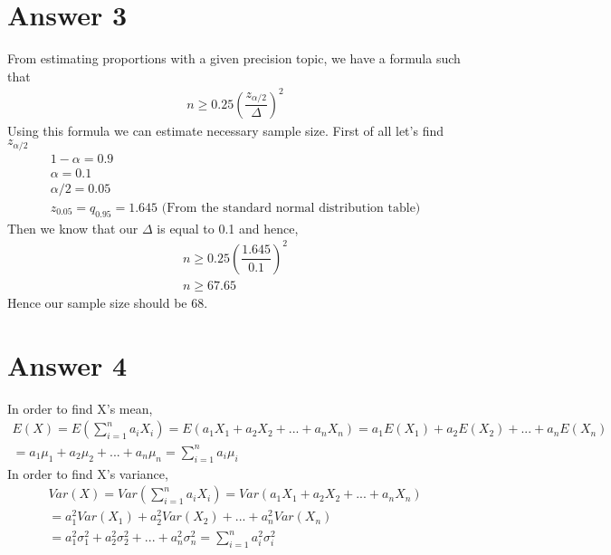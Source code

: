 \documentclass[12pt]{article}
\begin{document}
\section*{Answer 3}
From estimating proportions with a given precision topic, we have a formula such that
\begin{gather*}
    n \geq 0.25(\dfrac{z_{\alpha/2}}{\Delta})^2
\end{gather*}
Using this formula we can estimate necessary sample size. First of all let's find $z_{\alpha/2}$
\begin{gather*}
    1-\alpha = 0.9\\
    \alpha = 0.1 \\
    \alpha/2 = 0.05 \\
    z_{0.05} = q_{0.95} = 1.645 \text{   (From the standard normal distribution table)}
\end{gather*}
Then we know that our $\Delta$ is equal to 0.1 and hence,
\begin{gather*}
    n \geq 0.25 ( \dfrac{1.645}{0.1})^2 \\
    n \geq 67.65
\end{gather*}
Hence our sample size should be 68.
\section*{Answer 4}
In order to find X's mean,
\begin{gather*}
    E(X) = E(\sum_{i=1}^n a_iX_i)=E(a_1X_1+a_2X_2+...+a_nX_n) = a_1E(X_1)+a_2E(X_2)+...+a_nE(X_n) \\
    =a_1\mu_1+a_2\mu_2+...+a_n\mu_n = \sum_{i=1}^n a_i \mu_i
\end{gather*}
In order to find X's variance,
\begin{gather*}
    Var(X) = Var(\sum_{i=1}^n a_iX_i)=Var(a_1X_1+a_2X_2+...+a_nX_n)  \\
    = a_1^2Var(X_1)+a_2^2Var(X_2)+...+a_n^2Var(X_n) \\
    =a_1^2\sigma_1^2+a_2^2\sigma_2^2+...+a_n^2\sigma_n^2 = \sum_{i=1}^n a_i^2 \sigma_i^2
\end{gather*}
\end{document}
